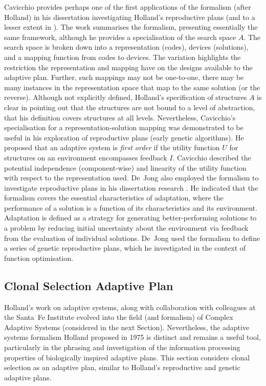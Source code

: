 Cavicchio provides perhaps one of the first applications of the formalism (after Holland) in his dissertation investigating Holland's reproductive plans \cite{Cavicchio1970} (and to a lesser extent in \cite{Daniel1972}). The work summarises the formalism, presenting essentially the same framework, although he provides a specialisation of the search space $A$. The search space is broken down into a representation (codes), devices (solutions), and a mapping function from codes to devices. The variation highlights the restriction the representation and mapping have on the designs available to the adaptive plan. Further, such mappings may not be one-to-one, there may be many instances in the representation space that map to the same solution (or the reverse). Although not explicitly defined, Holland's specification of structures $A$ is clear in pointing out that the structures are not bound to a level of abstraction, that his definition covers structures at all levels. Nevertheless, Cavicchio's specialisation for a representation-solution mapping was demonstrated to be useful in his exploration of reproductive plans (early genetic algorithms). He proposed that an adaptive system is \emph{first order} if the utility function $U$ for structures on an environment encompasses feedback $I$. Cavicchio described the potential independence (component-wise) and linearity of the utility function with respect to the representation used. De~Jong also employed the formalism to investigate reproductive plans in his dissertation research \cite{Jong1975}. He indicated that the formalism covers the essential characteristics of adaptation, where the performance of a solution is a function of its characteristics and its environment. Adaptation is defined as a strategy for generating better-performing solutions to a problem by reducing initial uncertainty about the environment via feedback from the evaluation of individual solutions. De~Jong used the formalism to define a series of genetic reproductive plans, which he investigated in the context of function optimisation.

%
%
\subsection{Clonal Selection Adaptive Plan}
\label{subsubsec:cs:adaptive:clonalselection}
Holland's work on adaptive systems, along with collaboration with colleagues at the Santa~Fe Institute evolved into the field (and formalism) of Complex Adaptive Systems (considered in the next Section). Nevertheless, the adaptive systems formalism Holland proposed in 1975 is distinct and remains a useful tool, particularly in the phrasing and investigation of the information processing properties of biologically inspired adaptive plans. This section considers clonal selection as an adaptive plan, similar to Holland's reproductive and genetic adaptive plans. 
%
%
